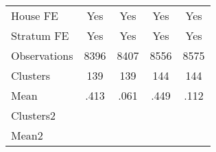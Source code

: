 {\begin{tabular}{l*{4}{c}}
House FE        &      Yes         &      Yes         &      Yes         &      Yes         \\
Stratum FE      &      Yes         &      Yes         &      Yes         &      Yes         \\
\hline
Observations    &     8396         &     8407         &     8556         &     8575         \\
Clusters        &      139         &      139         &      144         &      144         \\
Mean            &     .413         &     .061         &     .449         &     .112         \\
Clusters2       &                  &                  &                  &                  \\
Mean2           &                  &                  &                  &                  \\
\hline\hline
\end{tabular}
}
